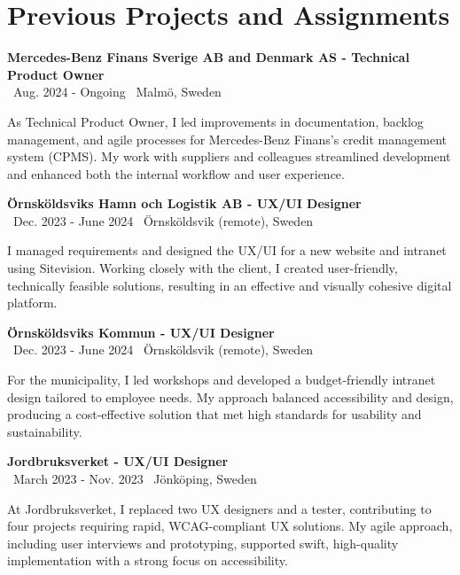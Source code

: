 \documentclass[a4paper,10pt]{article}
\begin{document}
\vspace{0.5cm}

\section*{Previous Projects and Assignments}

\textbf{Mercedes-Benz Finans Sverige AB and Denmark AS - Technical Product Owner}\\
\normalsize \faCalendar \ Aug. 2024 - Ongoing \quad \faMapMarker \ Malmö, Sweden

As Technical Product Owner, I led improvements in documentation, backlog management, and agile processes for Mercedes-Benz Finans’s credit management system (CPMS). My work with suppliers and colleagues streamlined development and enhanced both the internal workflow and user experience.

\vspace{0.5cm}
\textbf{Örnsköldsviks Hamn och Logistik AB - UX/UI Designer}\\
\normalsize \faCalendar \ Dec. 2023 - June 2024 \quad \faMapMarker \ Örnsköldsvik (remote), Sweden

I managed requirements and designed the UX/UI for a new website and intranet using Sitevision. Working closely with the client, I created user-friendly, technically feasible solutions, resulting in an effective and visually cohesive digital platform.

\vspace{0.5cm}
\textbf{Örnsköldsviks Kommun - UX/UI Designer}\\
\normalsize \faCalendar \ Dec. 2023 - June 2024 \quad \faMapMarker \ Örnsköldsvik (remote), Sweden

For the municipality, I led workshops and developed a budget-friendly intranet design tailored to employee needs. My approach balanced accessibility and design, producing a cost-effective solution that met high standards for usability and sustainability.

\vspace{0.5cm}
\textbf{Jordbruksverket - UX/UI Designer}\\
\normalsize \faCalendar \ March 2023 - Nov. 2023 \quad \faMapMarker \ Jönköping, Sweden

At Jordbruksverket, I replaced two UX designers and a tester, contributing to four projects requiring rapid, WCAG-compliant UX solutions. My agile approach, including user interviews and prototyping, supported swift, high-quality implementation with a strong focus on accessibility.
\end{document}
